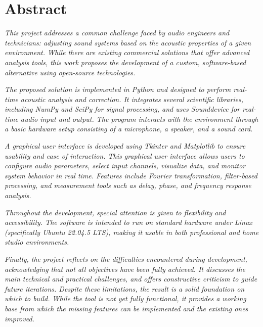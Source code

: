 \chapter*{Abstract}




\textit{This project addresses a common challenge faced by audio engineers and technicians: adjusting sound systems based on the acoustic properties of a given environment. While there are existing commercial solutions that offer advanced analysis tools, this work proposes the development of a custom, software-based alternative using open-source technologies.}
	
\textit{The proposed solution is implemented in Python and designed to perform real-time acoustic analysis and correction. It integrates several scientific libraries, including NumPy and SciPy for signal processing, and uses Sounddevice for real-time audio input and output. The program interacts with the environment through a basic hardware setup consisting of a microphone, a speaker, and a sound card.}
	
\textit{A graphical user interface is developed using Tkinter and Matplotlib to ensure usability and ease of interaction. This graphical user interface allows users to configure audio parameters, select input channels, visualize data, and monitor system behavior in real time. Features include Fourier transformation, filter-based processing, and measurement tools such as delay, phase, and frequency response analysis.}
	
\textit{Throughout the development, special attention is given to flexibility and accessibility. The software is intended to run on standard hardware under Linux (specifically Ubuntu 22.04.5 LTS), making it usable in both professional and home studio environments.}

\textit{Finally, the project reflects on the difficulties encountered during development, acknowledging that not all objectives have been fully achieved. It discusses the main technical and practical challenges, and offers constructive criticism to guide future iterations. Despite these limitations, the result is a solid foundation on which to build. While the tool is not yet fully functional, it provides a working base from which the missing features can be implemented and the existing ones improved.}